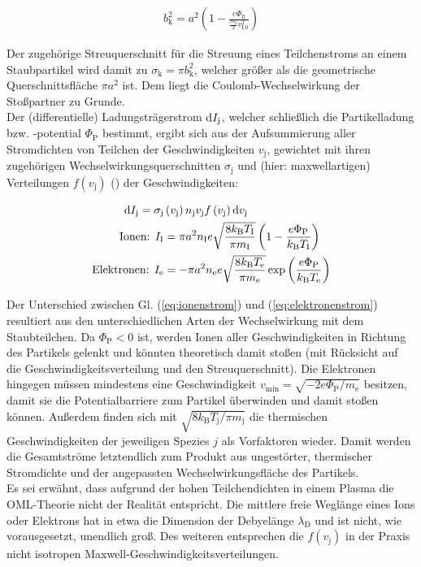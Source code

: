 \documentclass[numbers=noenddot,a4paper,notitlepage,twoside,BCOR15mm]{scrbook}
\newcommand{\diff}{\textnormal{d}}
\newcommand{\ix}[1]{_\text{#1}}
\begin{document}
				\begin{align}
					b\ix{k}^2=a^2\left(1-\frac{e\Phi\ix{fl}}{\frac{m\ix{I}}{2}v\ix{I,0}^2}\right) \label{eq:krit}
				\end{align}

			Der zugehörige Streuquerschnitt für die Streuung eines Teilchenstroms an einem Staubpartikel wird damit zu $\sigma\ix{k}=\pi b\ix{k}^2$, welcher größer als die geometrische Querschnittsfläche $\pi a^2$ ist. Dem liegt die Coulomb-Wechselwirkung der Stoßpartner zu Grunde.\\
			Der (differentielle) Ladungsträgerstrom $\diff I\ix{j}$, welcher schließlich die Partikelladung bzw. -potential $\Phi\ix{P}$ bestimmt, ergibt sich aus der Aufsummierung aller Stromdichten von Teilchen der Geschwindigkeiten $v\ix{j}$, gewichtet mit ihren zugehörigen Wechselwirkungsquerschnitten $\sigma\ix{j}$ und (hier: maxwellartigen) Verteilungen $f\left(v\ix{j}\right)$ (\cite{Melzer12}) der Geschwindigkeiten:

				\begin{align}
					\diff I\ix{j}=\sigma\ix{j}&\left(v\ix{j}\right)n\ix{j}v\ix{j}f\left(v\ix{j}\right)\diff v\ix{j} \nonumber \\
					\text{Ionen: } I\ix{I}&=\pi a^2n\ix{I}e\sqrt{\frac{8k\ix{B}T\ix{I}}{\pi m\ix{I}}}\left(1-\frac{e\Phi\ix{P}}{k\ix{B}T\ix{I}}\right) \label{eq:ionenstrom} \\
					\text{Elektronen: } I\ix{e}&=-\pi a^2n\ix{e}e\sqrt{\frac{8k\ix{B}T\ix{e}}{\pi m\ix{e}}}\exp\left(\frac{e\Phi\ix{P}}{k\ix{B}T\ix{e}}\right) \label{eq:elektronenstrom}
				\end{align}

			Der Unterschied zwischen Gl. (\ref{eq:ionenstrom}) und (\ref{eq:elektronenstrom}) resultiert aus den unterschiedlichen Arten der Wechselwirkung mit dem Staubteilchen. Da $\Phi\ix{P}<0$ ist, werden Ionen aller Geschwindigkeiten in Richtung des Partikels gelenkt und könnten theoretisch damit stoßen (mit Rücksicht auf die Geschwindigkeitsverteilung und den Streuquerschnitt). Die Elektronen hingegen müssen mindestens eine Geschwindigkeit $v\ix{min}=\sqrt{-2e\Phi\ix{P}/m\ix{e}}$ besitzen, damit sie die Potentialbarriere zum Partikel überwinden und damit stoßen können. Au{\ss}erdem finden sich mit $\sqrt{8k\ix{B}T\ix{j}/\pi m\ix{j}}$ die thermischen Geschwindigkeiten der jeweiligen Spezies $j$ als Vorfaktoren wieder. Damit werden die Gesamtstr\"ome letztendlich zum Produkt aus ungest\"orter, thermischer Stromdichte und der angepassten Wechselwirkungsfl\"ache des Partikels. \\
			Es sei erwähnt, dass aufgrund der hohen Teilchendichten in einem Plasma die OML-Theorie nicht der Realität entspricht. Die mittlere freie Weglänge eines Ions oder Elektrons hat in etwa die Dimension der Debyelänge $\lambda\ix{D}$ und ist nicht, wie vorausgesetzt, unendlich groß. Des weiteren entsprechen die $f\left(v\ix{j}\right)$ in der Praxis nicht isotropen Maxwell-Geschwindigkeitsverteilungen.
\end{document}
